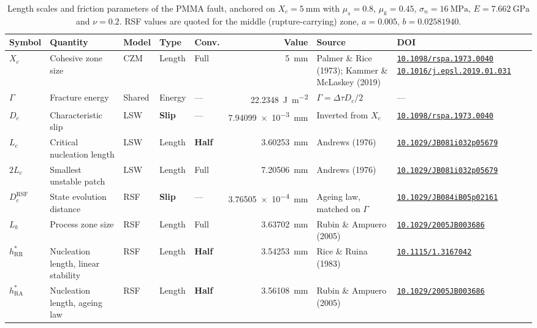 \documentclass[11pt]{article}
\newcommand{\doi}[1]{\href{https://doi.org/#1}{\scriptsize\texttt{#1}}}
\begin{document}
\begin{table}[htbp]
  \centering
  \footnotesize
  \caption{Length scales and friction parameters of the PMMA fault, anchored on
  $X_c = \SI{5}{\milli\meter}$ with $\mu_s = 0.8$, $\mu_k = 0.45$,
  $\sigma_n = \SI{16}{\mega\pascal}$, $E = \SI{7.662}{\giga\pascal}$ and
  $\nu = 0.2$. RSF values are quoted for the middle (rupture-carrying) zone,
  $a = 0.005$, $b = 0.02581940$.}
  \label{tab:czm-lsw-rsf}
  \setlength{\tabcolsep}{4pt}
  \begin{tabular}{@{}l L{2.6cm} l l l r L{2.5cm} L{4.0cm}@{}}
    \toprule
    Symbol & Quantity & Model & Type & Conv. & Value & Source & DOI \\
    \midrule
    $X_c$
      & Cohesive zone size
      & CZM & Length & Full
      & \SI{5}{\milli\meter}
      & Palmer \& Rice (1973); Kammer \& McLaskey (2019)
      & \doi{10.1098/rspa.1973.0040} \newline
        \doi{10.1016/j.epsl.2019.01.031} \\
    \addlinespace
    $\Gamma$
      & Fracture energy
      & Shared & Energy & ---
      & \SI{22.2348}{\joule\per\meter\squared}
      & $\Gamma = \Delta\tau D_c / 2$
      & --- \\
    \addlinespace
    $D_c$
      & Characteristic slip
      & LSW & \textbf{Slip} & ---
      & \SI{7.94099e-3}{\milli\meter}
      & Inverted from $X_c$
      & \doi{10.1098/rspa.1973.0040} \\
    \addlinespace
    $L_c$
      & Critical nucleation length
      & LSW & Length & \textbf{Half}
      & \SI{3.60253}{\milli\meter}
      & Andrews (1976)
      & \doi{10.1029/JB081i032p05679} \\
    $2L_c$
      & Smallest unstable patch
      & LSW & Length & Full
      & \SI{7.20506}{\milli\meter}
      & Andrews (1976)
      & \doi{10.1029/JB081i032p05679} \\
    \addlinespace
    $D_c^{\mathrm{RSF}}$
      & State evolution distance
      & RSF & \textbf{Slip} & ---
      & \SI{3.76505e-4}{\milli\meter}
      & Ageing law, matched on $\Gamma$
      & \doi{10.1029/JB084iB05p02161} \\
    \addlinespace
    $L_b$
      & Process zone size
      & RSF & Length & Full
      & \SI{3.63702}{\milli\meter}
      & Rubin \& Ampuero (2005)
      & \doi{10.1029/2005JB003686} \\
    \addlinespace
    $h^{*}_{\mathrm{RR}}$
      & Nucleation length, linear stability
      & RSF & Length & \textbf{Half}
      & \SI{3.54253}{\milli\meter}
      & Rice \& Ruina (1983)
      & \doi{10.1115/1.3167042} \\
    $h^{*}_{\mathrm{RA}}$
      & Nucleation length, ageing law
      & RSF & Length & \textbf{Half}
      & \SI{3.56108}{\milli\meter}
      & Rubin \& Ampuero (2005)
      & \doi{10.1029/2005JB003686} \\
    \bottomrule
  \end{tabular}
\end{table}
\end{document}
